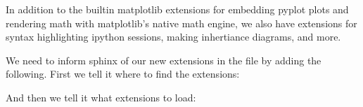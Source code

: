 \documentclass[letterpaper,10pt,english]{sphinxmanual}
\begin{document}
\begin{sphinxVerbatim}[commandchars=\\\{\}]
  
   
  
      
\end{sphinxVerbatim}

In addition to the builtin matplotlib extensions for embedding pyplot
plots and rendering math with matplotlib’s native math engine, we also
have extensions for syntax highlighting ipython sessions, making
inhertiance diagrams, and more.

We need to inform sphinx of our new extensions in the 
file by adding the following.  First we tell it where to find the extensions:

\begin{sphinxVerbatim}[commandchars=\\\{\}]
\end{sphinxVerbatim}

And then we tell it what extensions to load:
\end{document}
